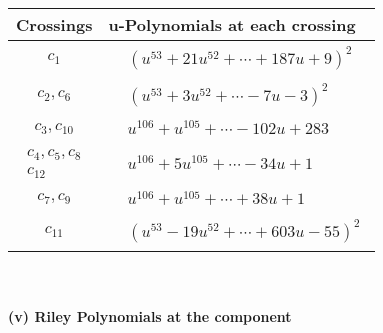 \documentclass[1p]{elsarticle_modified}
\theoremstyle{definition}
\begin{document}
\begin{tabular}{m{50pt}|m{274pt}}
Crossings & \hspace{64pt}u-Polynomials at each crossing \\
\hline $$\begin{aligned}c_{1}\end{aligned}$$&$\begin{aligned}
&(u^{53}+21 u^{52}+\cdots+187 u+9)^{2}
\end{aligned}$\\
\hline $$\begin{aligned}c_{2},c_{6}\end{aligned}$$&$\begin{aligned}
&(u^{53}+3 u^{52}+\cdots-7 u-3)^{2}
\end{aligned}$\\
\hline $$\begin{aligned}c_{3},c_{10}\end{aligned}$$&$\begin{aligned}
&u^{106}+u^{105}+\cdots-102 u+283
\end{aligned}$\\
\hline $$\begin{aligned}c_{4},c_{5},c_{8}\\c_{12}\end{aligned}$$&$\begin{aligned}
&u^{106}+5 u^{105}+\cdots-34 u+1
\end{aligned}$\\
\hline $$\begin{aligned}c_{7},c_{9}\end{aligned}$$&$\begin{aligned}
&u^{106}+u^{105}+\cdots+38 u+1
\end{aligned}$\\
\hline $$\begin{aligned}c_{11}\end{aligned}$$&$\begin{aligned}
&(u^{53}-19 u^{52}+\cdots+603 u-55)^{2}
\end{aligned}$\\
\hline
\end{tabular}\\~\\
\newpage\renewcommand{\arraystretch}{1}
\flushleft \textbf{(v) Riley Polynomials at the component}\newline \\
\end{document}
